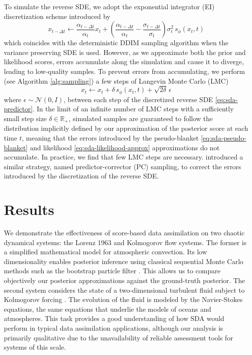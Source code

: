 To simulate the reverse SDE, we adopt the exponential integrator (EI) discretization scheme introduced by \textcite{zhang2023fast}
\begin{equation} \label{eq:sda-predictor}
    x_{t - \Delta t} \gets \frac{\alpha_{t - \Delta t}}{\alpha_t} x_t + \left( \frac{\alpha_{t - \Delta t}}{\alpha_t} - \frac{\sigma_{t - \Delta t}}{\sigma_t} \right) \sigma_t^2 \, s_\phi(x_t, t)
\end{equation}
which coincides with the deterministic DDIM \cite{song2021denoising} sampling algorithm when the variance preserving SDE \cite{ho2020denoising} is used. However, as we approximate both the prior and likelihood scores, errors accumulate along the simulation and cause it to diverge, leading to low-quality samples. To prevent errors from accumulating, we perform (see Algorithm \ref{alg:sampling}) a few steps of Langevin Monte Carlo (LMC) \cite{parisi1981correlation, grenander1994representations}
\begin{equation} \label{eq:sda-corrector}
    x_t \gets x_t + \delta \, s_\phi(x_t, t) + \sqrt{2 \delta} \, \epsilon
\end{equation}
where $\epsilon \sim \mathcal{N}(0, I)$, between each step of the discretized reverse SDE \eqref{eq:sda-predictor}. In the limit of an infinite number of LMC steps with a sufficiently small step size $\delta \in \mathbb{R}_+$, simulated samples are guaranteed to follow the distribution implicitly defined by our approximation of the posterior score at each time $t$, meaning that the errors introduced by the pseudo-blanket \eqref{eq:sda-pseudo-blanket} and likelihood \eqref{eq:sda-likelihood-approx} approximations do not accumulate. In practice, we find that few LMC steps are necessary. \textcite{song2021scorebased} introduced a similar strategy, named predictor-corrector (PC) sampling, to correct the errors introduced by the discretization of the reverse SDE.

\section{Results}

We demonstrate the effectiveness of score-based data assimilation on two chaotic dynamical systems: the Lorenz 1963 \cite{lorenz1963deterministic} and Kolmogorov flow \cite{chandler2013invariant} systems. The former is a simplified mathematical model for atmospheric convection. Its low dimensionality enables posterior inference using classical sequential Monte Carlo methods \cite{liu1998sequential, doucet2011tutorial} such as the bootstrap particle filter \cite{gordon1993novel}. This allows us to compare objectively our posterior approximations against the ground-truth posterior. The second system considers the state of a two-dimensional turbulent fluid subject to Kolmogorov forcing \cite{chandler2013invariant}. The evolution of the fluid is modeled by the Navier-Stokes equations, the same equations that underlie the models of oceans and atmospheres. This task provides a good understanding of how SDA would perform in typical data assimilation applications, although our analysis is primarily qualitative due to the unavailability of reliable assessment tools for systems of this scale.

